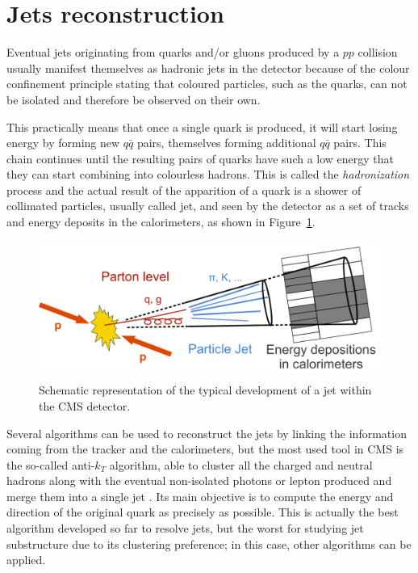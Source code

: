 \documentclass[a4paper, 10pt, openright]{report}
\begin{document}
\section{Jets reconstruction} \label{section:RecoJet}

Eventual jets originating from quarks and/or gluons produced by a $pp$ collision usually manifest themselves as hadronic jets in the detector because of the colour confinement principle stating that coloured particles, such as the quarks, can not be isolated and therefore be observed on their own. 

This practically means that once a single quark is produced, it will start losing energy by forming new $q \bar q$ pairs, themselves forming additional $q \bar q$ pairs. This chain continues until the resulting pairs of quarks have such a low energy that they can start combining into colourless hadrons. This is called the \textit{hadronization} process and the actual result of the apparition of a quark is a shower of collimated particles, usually called jet, and seen by the detector as a set of tracks and energy deposits in the calorimeters, as shown in Figure~\ref{fig:CMSJets}. %

\begin{figure}[htbp]
\begin{center}
\includegraphics[width=12cm, height=4.5cm]{figs/CMSJets.png}
\caption{Schematic representation of the typical development of a jet within the \ac{CMS} detector.}
\label{fig:CMSJets}
\end{center}
\end{figure}

Several algorithms can be used to reconstruct the jets by linking the information coming from the tracker and the calorimeters, but the most used tool in \ac{CMS} is the so-called anti-$k_T$ algorithm, able to cluster all the charged and neutral hadrons along with the eventual non-isolated photons or lepton produced and merge them into a single jet \cite{JetReco}. Its main objective is to compute the energy and direction of the original quark as precisely as possible. This is actually the best algorithm developed so far to resolve jets, but the worst for studying jet substructure due to its clustering preference; in this case, other algorithms can be applied.
\end{document}
